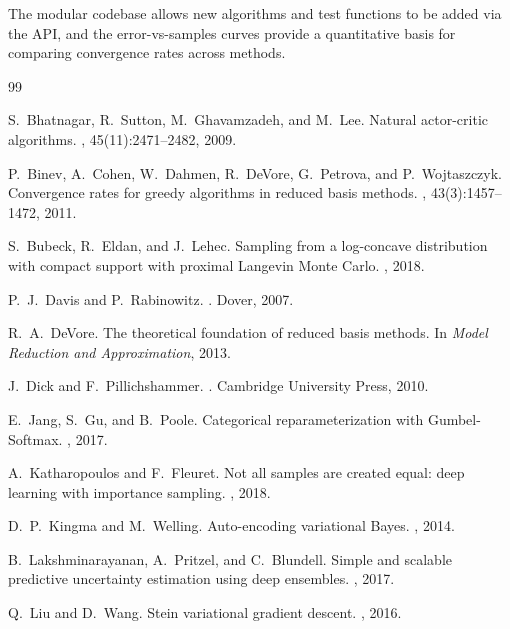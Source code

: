 \documentclass[11pt,a4paper]{article}
\begin{document}
The modular codebase allows new algorithms and test functions to be added
via the API, and the error-vs-samples curves provide a quantitative basis
for comparing convergence rates across methods.


\begin{thebibliography}{99}

S.~Bhatnagar, R.~Sutton, M.~Ghavamzadeh, and M.~Lee.
\newblock Natural actor-critic algorithms.
, 45(11):2471--2482, 2009.

P.~Binev, A.~Cohen, W.~Dahmen, R.~DeVore, G.~Petrova, and P.~Wojtaszczyk.
\newblock Convergence rates for greedy algorithms in reduced basis methods.
, 43(3):1457--1472, 2011.

S.~Bubeck, R.~Eldan, and J.~Lehec.
\newblock Sampling from a log-concave distribution with compact support
         with proximal Langevin Monte Carlo.
, 2018.

P.~J.~Davis and P.~Rabinowitz.
.
\newblock Dover, 2007.

R.~A.~DeVore.
\newblock The theoretical foundation of reduced basis methods.
\newblock In {\em Model Reduction and Approximation}, 2013.

J.~Dick and F.~Pillichshammer.
.
\newblock Cambridge University Press, 2010.

E.~Jang, S.~Gu, and B.~Poole.
\newblock Categorical reparameterization with Gumbel-Softmax.
, 2017.

A.~Katharopoulos and F.~Fleuret.
\newblock Not all samples are created equal: deep learning with
         importance sampling.
, 2018.

D.~P.~Kingma and M.~Welling.
\newblock Auto-encoding variational Bayes.
, 2014.

B.~Lakshminarayanan, A.~Pritzel, and C.~Blundell.
\newblock Simple and scalable predictive uncertainty estimation using
         deep ensembles.
, 2017.

Q.~Liu and D.~Wang.
\newblock Stein variational gradient descent.
, 2016.


\end{thebibliography}
\end{document}
